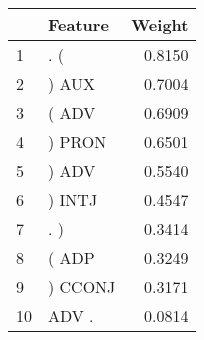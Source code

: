 \begin{tabular}{llr}
\toprule
{} &  Feature &  Weight \\
\midrule
1  &      . ( &  0.8150 \\
2  &    ) AUX &  0.7004 \\
3  &    ( ADV &  0.6909 \\
4  &   ) PRON &  0.6501 \\
5  &    ) ADV &  0.5540 \\
6  &   ) INTJ &  0.4547 \\
7  &      . ) &  0.3414 \\
8  &    ( ADP &  0.3249 \\
9  &  ) CCONJ &  0.3171 \\
10 &    ADV . &  0.0814 \\
\bottomrule
\end{tabular}
